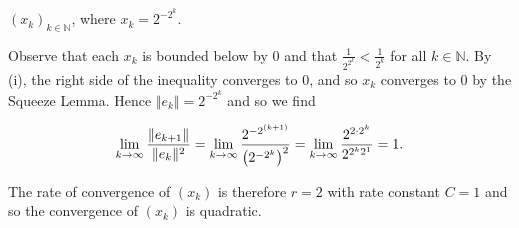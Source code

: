 $(x_k)_{k \in \mathbb{N}}$, where $x_k = 2^{-2^k}$.

\begin{solution}
  Observe that each $x_k$ is bounded below by 0 and that $\frac{1}{2^{2^k}} < \frac{1}{2^k}$ for all 
  $k \in \mathbb{N}$. By (i), the right side of the inequality converges to 0, and so $x_k$ converges to 0 by the 
  Squeeze Lemma. Hence $\Vert e_{k} \Vert = 2^{-2^k}$ and so we find

  $$
    \lim\limits_{k \to \infty} \frac{\Vert e_{k+1} \Vert}{\Vert e_k \Vert^2} 
        = \lim\limits_{k \to \infty} \frac{2^{-2^{(k+1)}}}{\left(2^{-2^k}\right)^2} \\
        = \lim\limits_{k \to \infty} \frac{2^{2 \cdot 2^k}}{2^{2^k 2^1}} \\
        = 1.
  $$

  The rate of convergence of $(x_k)$ is therefore $r = 2$ with rate constant $C = 1$ and so the convergence
  of $(x_k)$ is quadratic.
  \ \\
\end{solution}